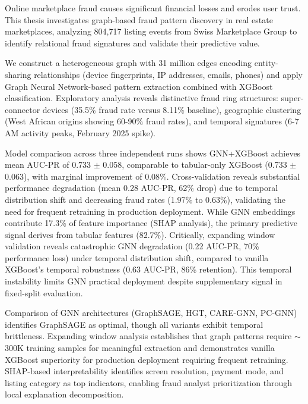 \documentclass[11pt,a4paper]{report}
\let\oldabstract\abstract
\let\endoldabstract\endabstract
\renewenvironment{abstract}
  {\oldabstract\onehalfspacing\setlength{\parindent}{0pt}\setlength{\parskip}{0.6em}\rmfamily\fontsize{11}{13.2}\selectfont}
  {\endoldabstract}
\begin{document}
\begin{abstract}
Online marketplace fraud causes significant financial losses and erodes user trust. This thesis investigates graph-based fraud pattern discovery in real estate marketplaces, analyzing 804,717 listing events from Swiss Marketplace Group to identify relational fraud signatures and validate their predictive value.

We construct a heterogeneous graph with 31 million edges encoding entity-sharing relationships (device fingerprints, IP addresses, emails, phones) and apply Graph Neural Network-based pattern extraction combined with XGBoost classification. Exploratory analysis reveals distinctive fraud ring structures: super-connector devices (35.5\% fraud rate versus 8.11\% baseline), geographic clustering (West African origins showing 60-90\% fraud rates), and temporal signatures (6-7 AM activity peaks, February 2025 spike).

Model comparison across three independent runs shows GNN+XGBoost achieves mean AUC-PR of 0.733 $\pm$ 0.058, comparable to tabular-only XGBoost (0.733 $\pm$ 0.063), with marginal improvement of 0.08\%. Cross-validation reveals substantial performance degradation (mean 0.28 AUC-PR, 62\% drop) due to temporal distribution shift and decreasing fraud rates (1.97\% to 0.63\%), validating the need for frequent retraining in production deployment. While GNN embeddings contribute 17.3\% of feature importance (SHAP analysis), the primary predictive signal derives from tabular features (82.7\%). Critically, expanding window validation reveals catastrophic GNN degradation (0.22 AUC-PR, 70\% performance loss) under temporal distribution shift, compared to vanilla XGBoost's temporal robustness (0.63 AUC-PR, 86\% retention). This temporal instability limits GNN practical deployment despite supplementary signal in fixed-split evaluation.

Comparison of GNN architectures (GraphSAGE, HGT, CARE-GNN, PC-GNN) identifies GraphSAGE as optimal, though all variants exhibit temporal brittleness. Expanding window analysis establishes that graph patterns require $\sim$300K training samples for meaningful extraction and demonstrates vanilla XGBoost superiority for production deployment requiring frequent retraining. SHAP-based interpretability identifies screen resolution, payment mode, and listing category as top indicators, enabling fraud analyst prioritization through local explanation decomposition.


\end{abstract}
\end{document}
